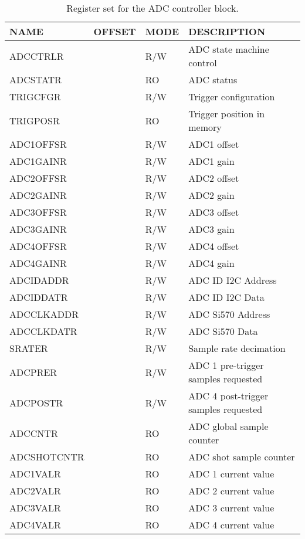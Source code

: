 \documentclass{article}
\begin{document}
\begin{table}[htbp]
  \centering
  \begin{tabularx}{\textwidth}{|l|r|l|X|}
    \hline
    \textbf{NAME} & \textbf{OFFSET} & \textbf{MODE} & \textbf{DESCRIPTION} \\
    \hline
    \hline
    ADCCTRLR & & R/W & ADC state machine control\\
    \hline
    ADCSTATR & & RO & ADC status \\
    \hline
    TRIGCFGR & & R/W & Trigger configuration \\
    \hline
    TRIGPOSR & & RO & Trigger position in memory \\
    \hline
    ADC1OFFSR & & R/W & ADC1 offset \\
    \hline
    ADC1GAINR & & R/W & ADC1 gain \\
    \hline
    ADC2OFFSR & & R/W & ADC2 offset \\
    \hline
    ADC2GAINR & & R/W & ADC2 gain \\
    \hline
    ADC3OFFSR & & R/W & ADC3 offset \\
    \hline
    ADC3GAINR & & R/W & ADC3 gain \\
    \hline
    ADC4OFFSR & & R/W & ADC4 offset \\
    \hline
    ADC4GAINR & & R/W & ADC4 gain \\
    \hline
    ADCIDADDR & & R/W & ADC ID I2C Address \\
    \hline
    ADCIDDATR & & R/W & ADC ID I2C Data \\
    \hline
    ADCCLKADDR & & R/W & ADC Si570 Address \\
    \hline
    ADCCLKDATR & & R/W & ADC Si570 Data \\
    \hline
    SRATER & & R/W & Sample rate decimation \\
    \hline
    ADCPRER & & R/W & ADC 1 pre-trigger samples requested \\
    \hline
    ADCPOSTR & & R/W & ADC 4 post-trigger samples requested \\
    \hline
    ADCCNTR & & RO & ADC global sample counter \\
    \hline
    ADCSHOTCNTR & & RO & ADC shot sample counter \\
    \hline
    ADC1VALR & & RO & ADC 1 current value \\
    \hline
    ADC2VALR & & RO & ADC 2 current value \\
    \hline
    ADC3VALR & & RO & ADC 3 current value \\
    \hline
    ADC4VALR & & RO & ADC 4 current value \\
    \hline
  \end{tabularx}
  \caption{Register set for the ADC controller block.}
  \label{tab:adc_control}
\end{table}
\end{document}
